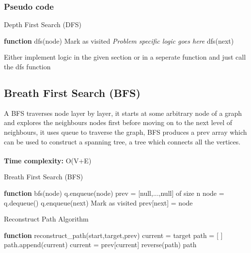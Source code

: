 \documentclass[12pt]{extarticle}
\begin{document}
\subsubsection*{Pseudo code}

\begin{algorithm} [H]
    \caption{Depth First Search (DFS)}
    \begin{algorithmic}[1]
        \STATE \textbf{function} dfs(node)
        \RETURN
        \ENDIF
        \STATE Mark as visited
        \STATE \textit{Problem specific logic goes here}
        \STATE dfs(next)
        \ENDFOR
    \end{algorithmic}
\end{algorithm}

Either implement logic in the given section or in a seperate function and just call 
the dfs function

\subsection{Breath First Search (BFS)}
A BFS traverses node layer by layer, it starts at some arbitrary node of a graph and explores the neighbours nodes first before moving on to the next level of neighbours, it uses queue to traverse the graph, BFS produces a prev array which can be used to construct
a spanning tree, a tree which connects all the vertices.\\ \\  
\textbf{Time complexity:} O(V+E)

\begin{algorithm}
    \caption {Breath First Search (BFS)}
    \begin{algorithmic}[1]
        \STATE \textbf{function} bfs(node)
        \STATE q.enqueue(node)
        \STATE prev = [null,...,null] of size n
        \STATE node = q.dequeue()
        \STATE q.enqueue(next)
        \STATE Mark as visited
        \STATE prev[next] = node
        \ENDIF
        \ENDFOR
        
        \ENDWHILE
    \end{algorithmic}
\end{algorithm}


\begin{algorithm}
\caption{Reconstruct Path Algorithm}
    \begin{algorithmic}
        \STATE \textbf{function} reconstruct\_path(start,target,prev)
        \STATE current = target
        \STATE path = [ ]
        \STATE path.append(current)
        \STATE current = prev[current]
        \ENDWHILE
        \STATE reverse(path)
        \RETURN path
        \ELSE
        \RETURN [ ]
        \ENDIF
    \end{algorithmic}
\end{algorithm}
\end{document}
